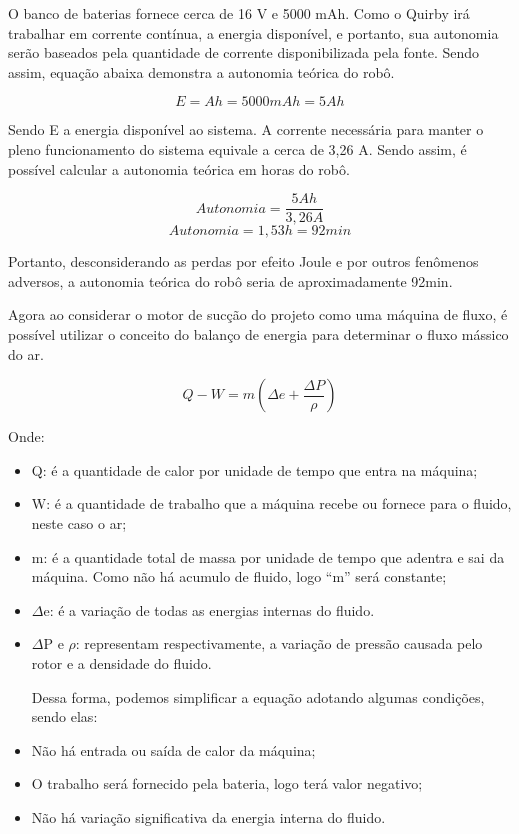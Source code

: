 O banco de baterias fornece cerca de 16 V e 5000 mAh. Como o Quirby irá trabalhar em corrente contínua, a energia disponível, e portanto, sua autonomia serão baseados pela quantidade de corrente disponibilizada pela fonte. Sendo assim, equação abaixa demonstra a autonomia teórica do robô.

\begin{equation}
E = Ah = 5000 mAh = 5 Ah
\end{equation}

Sendo E a energia disponível ao sistema. 
A corrente necessária para manter o pleno funcionamento do sistema equivale a cerca de 3,26 A. Sendo assim, é possível calcular a autonomia teórica em horas do robô.

\begin{equation}
    Autonomia = \frac{5 Ah}{3,26 A}
\end{equation}
\begin{equation}
    Autonomia = 1,53 h = 92 min
\end{equation}

Portanto, desconsiderando as perdas por efeito Joule e por outros fenômenos adversos, a autonomia teórica do robô seria de aproximadamente 92min.

Agora ao considerar o motor de sucção do projeto como uma máquina de fluxo, é possível utilizar o conceito do balanço de energia para determinar o fluxo mássico do ar.

\begin{equation}
Q-W = m\left(\Delta e+\frac{\Delta P}{\rho}\right)
\end{equation}

Onde:
\begin{itemize}
	\item{Q:} é a quantidade de calor por unidade de tempo que entra na máquina;
	\item{W:} é a quantidade de trabalho que a máquina recebe ou fornece para o fluido, neste caso o ar;
	\item{m:} é a quantidade total de massa por unidade de tempo que adentra e sai da máquina. Como não há acumulo de fluido, logo “m” será constante;
	\item{$\Delta$e:} é a variação de todas as energias internas do fluido.
	\item {$\Delta$P e \(\rho\):} representam respectivamente, a variação de pressão causada pelo rotor e a densidade do fluido.

Dessa forma, podemos simplificar a equação adotando algumas condições, sendo elas:

	\item Não há entrada ou saída de calor da máquina; 
	\item O trabalho será fornecido pela bateria, logo terá valor negativo;
	\item Não há variação significativa da energia interna do fluido.

\end{itemize}

